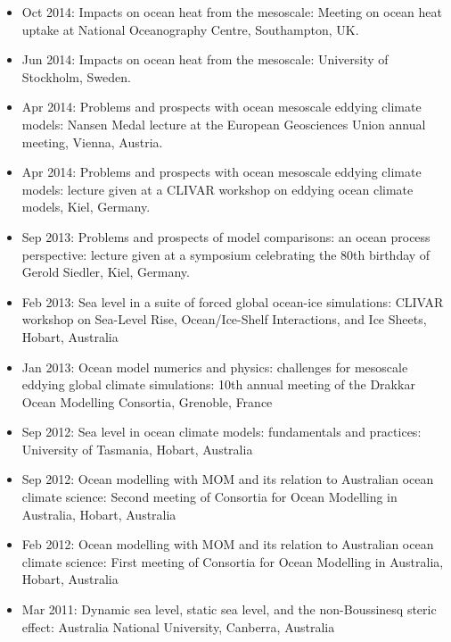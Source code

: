 \documentclass{article}
\begin{document}
\begin{itemize}[leftmargin=*]
\item Oct 2014: {\sc Impacts on ocean heat from the mesoscale}:
  Meeting on ocean heat uptake at National Oceanography Centre,
  Southampton, UK.

\item Jun 2014: {\sc Impacts on ocean heat from the mesoscale}:
  University of Stockholm, Sweden.

\item Apr 2014: {\sc Problems and prospects with ocean mesoscale
    eddying climate models}: Nansen Medal lecture at the European
  Geosciences Union annual meeting, Vienna, Austria.

\item Apr 2014: {\sc Problems and prospects with ocean mesoscale
    eddying climate models}: lecture given at a CLIVAR workshop on
  eddying ocean climate models, Kiel, Germany.

\item Sep 2013: {\sc Problems and prospects of model comparisons: an
    ocean process perspective}: lecture given at a symposium
  celebrating the 80th birthday of Gerold Siedler, Kiel, Germany.

\item Feb 2013: {\sc Sea level in a suite of forced global ocean-ice
    simulations}: CLIVAR workshop on Sea-Level Rise, Ocean/Ice-Shelf
  Interactions, and Ice Sheets, Hobart, Australia

\item Jan 2013: {\sc Ocean model numerics and physics: challenges for
    mesoscale eddying global climate simulations}: 10th annual meeting
  of the Drakkar Ocean Modelling Consortia, Grenoble, France

\item Sep 2012: {\sc Sea level in ocean climate models: fundamentals
    and practices}: University of Tasmania, Hobart, Australia

\item Sep 2012: {\sc Ocean modelling with MOM and its relation to
    Australian ocean climate science}: Second meeting of Consortia for
  Ocean Modelling in Australia, Hobart, Australia

\item Feb 2012: {\sc Ocean modelling with MOM and its relation to
    Australian ocean climate science}: First meeting of Consortia for
  Ocean Modelling in Australia, Hobart, Australia

\item Mar 2011: {\sc Dynamic sea level, static sea level, and the
    non-Boussinesq steric effect}: Australia National University,
  Canberra, Australia


\end{itemize}
\end{document}
